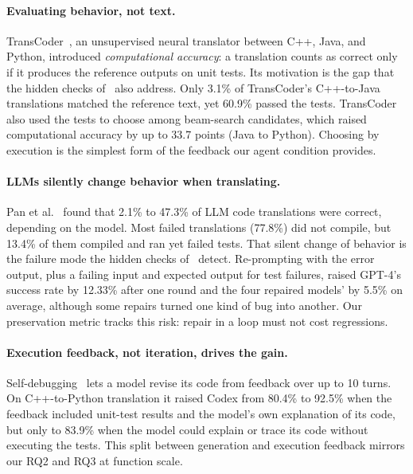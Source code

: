 \documentclass[11pt]{article}
\begin{document}
\paragraph{Evaluating behavior, not text.}
TransCoder~\cite{roziere2020transcoder}, an unsupervised neural translator between C++, Java, and Python, introduced \emph{computational accuracy}: a translation counts as correct only if it produces the reference outputs on unit tests.
Its motivation is the gap that the hidden checks of~\cite{mahmud2026modernization} also address.
Only 3.1\% of TransCoder's C++-to-Java translations matched the reference text, yet 60.9\% passed the tests.
TransCoder also used the tests to choose among beam-search candidates, which raised computational accuracy by up to 33.7 points (Java to Python).
Choosing by execution is the simplest form of the feedback our agent condition provides.

\paragraph{LLMs silently change behavior when translating.}
Pan et al.~\cite{pan2024lost} found that 2.1\% to 47.3\% of LLM code translations were correct, depending on the model.
Most failed translations (77.8\%) did not compile, but 13.4\% of them compiled and ran yet failed tests.
That silent change of behavior is the failure mode the hidden checks of~\cite{mahmud2026modernization} detect.
Re-prompting with the error output, plus a failing input and expected output for test failures, raised GPT-4's success rate by 12.33\% after one round and the four repaired models' by 5.5\% on average, although some repairs turned one kind of bug into another.
Our preservation metric tracks this risk: repair in a loop must not cost regressions.

\paragraph{Execution feedback, not iteration, drives the gain.}
Self-debugging~\cite{chen2024selfdebug} lets a model revise its code from feedback over up to 10 turns.
On C++-to-Python translation it raised Codex from 80.4\% to 92.5\% when the feedback included unit-test results and the model's own explanation of its code, but only to 83.9\% when the model could explain or trace its code without executing the tests.
This split between generation and execution feedback mirrors our RQ2 and RQ3 at function scale.
\end{document}
